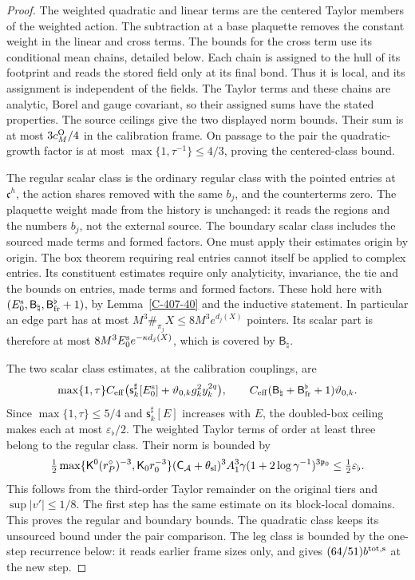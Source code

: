 \documentclass[11pt,letterpaper,reqno]{amsart}
\theoremstyle{definition}
\theoremstyle{remark}
\begin{document}
\begin{proof}
The weighted quadratic and linear terms are the centered
Taylor members of the weighted action. The subtraction at a
base plaquette removes the constant weight in the linear and
cross terms. The bounds for the cross term use its conditional
mean chains, detailed below. Each chain is assigned to the hull
of its footprint and reads the stored field only at its final
bond. Thus it is local, and its assignment is independent of
the fields. The Taylor terms and these chains are analytic,
Borel and gauge covariant, so their assigned sums have the
stated properties. The source ceilings give the two displayed
norm bounds. Their sum is at most $3c_M^{\rm O}/4$ in the
calibration frame. On passage to the pair the quadratic-growth
factor is at most $\max\{1,\tau^{-1}\}\le4/3$, proving the
centered-class bound.

The regular scalar class is the ordinary regular class with
the pointed entries at $\mathfrak c^h$, the action shares removed
with the same $b_j$, and the counterterms zero. The plaquette
weight made from the history is unchanged: it reads the regions
and the numbers $b_j$, not the external source. The boundary
scalar class includes the sourced made terms and formed factors.
One must apply their estimates origin by origin. The box theorem
requiring real entries cannot itself be applied to complex
entries. Its constituent estimates require only analyticity,
invariance, the tie and the bounds on entries, made terms and
formed factors. These hold here with
$(E_0^{\rm s},\mathsf B_\natural,\mathsf B_{\rm fr}^\flat+1)$,
by Lemma~\ref{C-407-40} and the inductive statement. In
particular an edge part has at most
$M^3\#_{\pi_j}X\le8M^3e^{d_j(X)}$ pointers. Its scalar part
is therefore at most $8M^3E_0^{\rm s}e^{-\kappa d_j(X)}$,
which is covered by $\mathsf B_\natural$.

The two scalar class estimates, at the calibration couplings,
are
\[
 \max\{1,\tau\}C_{\rm eff}
  \bigl(\mathsf s_k^\sharp[E_0^{\rm s}]
                   +\vartheta_{0,k}g_k^2y_k^{2q}\bigr),
 \qquad
 C_{\rm eff}(\mathsf B_\natural+
                     \mathsf B_{\rm fr}^\flat+1)\vartheta_{0,k}.
\]
Since $\max\{1,\tau\}\le5/4$ and
$\mathsf s_k^\sharp[E]$ increases with $E$, the doubled-box
ceiling makes each at most $\varepsilon_\flat/2$. The weighted
Taylor terms of order at least three belong to the regular
class. Their norm is bounded by
\[
 \tfrac12\max\{\mathsf K^0(r_P^\circ)^{-3},
                         \mathsf K_0r_0^{-3}\}
 (\mathsf C_{\mathcal A}+\theta_{\rm sl})^3 A_1^3
       \gamma(1+2\log\gamma^{-1})^{3\mathfrak p_0}
       \le\tfrac12\varepsilon_\flat.
\]
This follows from the third-order Taylor remainder on the
original tiers and $\sup|v'|\le1/8$. The first step has the
same estimate on its block-local domains. This proves the
regular and boundary bounds. The quadratic class keeps its
unsourced bound under the pair comparison. The leg class is
bounded by the one-step recurrence below: it reads earlier
frame sizes only, and gives $(64/51)b^{\rm tot,s}$ at the
new step.


\end{proof}
\end{document}
